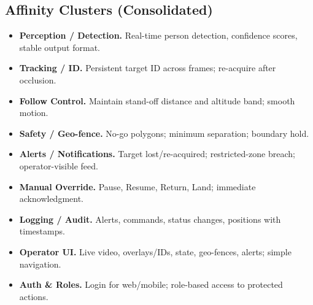 \documentclass[12pt,a4paper]{report}
\begin{document}
\subsection*{Affinity Clusters (Consolidated)}
\begin{itemize}[leftmargin=*]
\item \textbf{Perception / Detection.} Real-time person detection, confidence scores, stable output format. 
\item \textbf{Tracking / \ac{ID}.} Persistent target \ac{ID} across frames; re-acquire after occlusion.
\item \textbf{Follow Control.} Maintain stand-off distance and altitude band; smooth motion.
\item \textbf{Safety / Geo-fence.} No-go polygons; minimum separation; boundary hold.
\item \textbf{Alerts / Notifications.} Target lost/re-acquired; restricted-zone breach; operator-visible feed.
\item \textbf{Manual Override.} Pause, Resume, Return, Land; immediate acknowledgment.
\item \textbf{Logging / Audit.} Alerts, commands, status changes, positions with timestamps.
\item \textbf{Operator UI.} Live video, overlays/IDs, state, geo-fences, alerts; simple navigation.
\item \textbf{Auth \& Roles.} Login for web/mobile; role-based access to protected actions.
\end{itemize}
\end{document}
